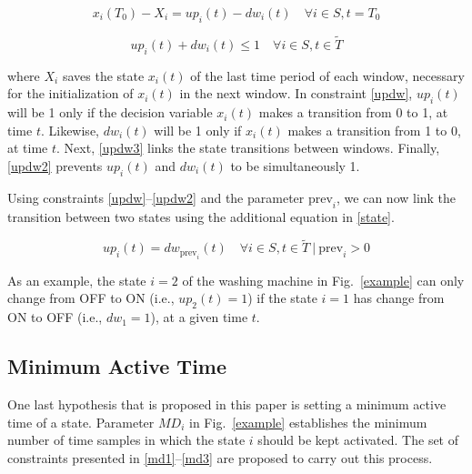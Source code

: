 \begin{equation} \label{updw3}
    x_i(T_0) - X_i = up_i(t) - dw_i(t) \quad \forall i \in S, t = T_0
\end{equation}

\begin{equation} \label{updw2}
    up_i(t) + dw_i(t) \leq 1 \quad \forall i \in S, t \in \tilde{T}
\end{equation}

\noindent where $X_i$ saves the state $x_i(t)$ of the last time period of each window, necessary for the initialization of $x_i(t)$ in the next window. In constraint \eqref{updw}, $up_i(t)$ will be 1 only if the decision variable $x_i(t)$ makes a transition from 0 to 1, at time $t$. Likewise, $dw_i(t)$ will be 1 only if $x_i(t)$ makes a transition from 1 to 0, at time $t$. Next, \eqref{updw3} links the state transitions between windows. Finally, \eqref{updw2} prevents $up_i(t)$ and $dw_i(t)$ to be simultaneously 1.


Using constraints \eqref{updw}--\eqref{updw2} and the parameter $\text{prev}_i$, we can now link the transition between two states using the additional equation in \eqref{state}.

\begin{equation} \label{state}
    up_i(t) = dw_{\text{prev}_i}(t) \quad \forall i \in S, t \in \tilde{T} \ | \ \text{prev}_i>0
\end{equation}

As an example, the state $i = 2$ of the washing machine in Fig.~\ref{example} can only change from OFF to ON (i.e., $up_2(t) = 1$) if the state $i = 1$ has change from ON to OFF (i.e., $dw_1 = 1$), at a given time $t$.

\subsection{Minimum Active Time}

One last hypothesis that is proposed in this paper is setting a minimum active time of a state. Parameter $MD_i$ in Fig.~\ref{example} establishes the minimum number of time samples in which the state $i$ should be kept activated. The set of constraints presented in \eqref{md1}--\eqref{md3} are proposed to carry out this process. 

